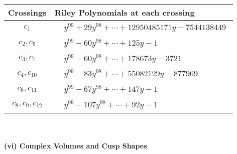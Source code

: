 \documentclass[1p]{elsarticle_modified}
\theoremstyle{definition}
\begin{document}
\begin{tabular}{m{50pt}|m{274pt}}
Crossings & \hspace{64pt}Riley Polynomials at each crossing \\
\hline $$\begin{aligned}c_{1}\end{aligned}$$&$\begin{aligned}
&y^{99}+29 y^{98}+\cdots+12950485171 y-7544138449
\end{aligned}$\\
\hline $$\begin{aligned}c_{2},c_{5}\end{aligned}$$&$\begin{aligned}
&y^{99}-60 y^{98}+\cdots+125 y-1
\end{aligned}$\\
\hline $$\begin{aligned}c_{3},c_{7}\end{aligned}$$&$\begin{aligned}
&y^{99}-60 y^{98}+\cdots+178673 y-3721
\end{aligned}$\\
\hline $$\begin{aligned}c_{4},c_{10}\end{aligned}$$&$\begin{aligned}
&y^{99}-83 y^{98}+\cdots+55082129 y-877969
\end{aligned}$\\
\hline $$\begin{aligned}c_{6},c_{11}\end{aligned}$$&$\begin{aligned}
&y^{99}-67 y^{98}+\cdots+147 y-1
\end{aligned}$\\
\hline $$\begin{aligned}c_{8},c_{9},c_{12}\end{aligned}$$&$\begin{aligned}
&y^{99}-107 y^{98}+\cdots+92 y-1
\end{aligned}$\\
\hline
\end{tabular}\\~\\
\newpage\flushleft \textbf{(vi) Complex Volumes and Cusp Shapes}
\end{document}
